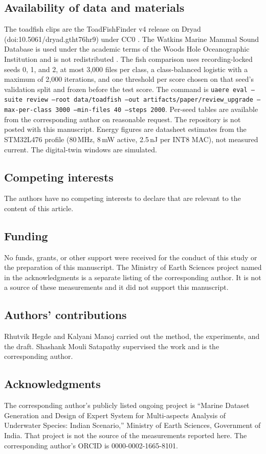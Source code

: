 \documentclass[sn-mathphys-num]{sn-jnl}%
\theoremstyle{thmstyleone}%
\theoremstyle{thmstyletwo}%
\theoremstyle{thmstylethree}%
\begin{document}
\subsection*{Availability of data and materials}
The toadfish clips are the ToadFishFinder v4 release on Dryad (doi:10.5061/dryad.gtht76hr9) under CC0 \cite{bohnenstiehl2023data}. The Watkins Marine Mammal Sound Database is used under the academic terms of the Woods Hole Oceanographic Institution and is not redistributed \cite{sayigh2016}. The fish comparison uses recording-locked seeds 0, 1, and 2, at most 3{,}000 files per class, a class-balanced logistic with a maximum of 2{,}000 iterations, and one threshold per score chosen on that seed's validation split and frozen before the test score. The command is \texttt{uaere eval --suite review --root data/toadfish --out artifacts/paper/review\_upgrade --max-per-class 3000 --min-files 40 --steps 2000}. Per-seed tables are available from the corresponding author on reasonable request. The repository is not posted with this manuscript. Energy figures are datasheet estimates from the STM32L476 profile (80\,MHz, 8\,mW active, 2.5\,nJ per INT8 MAC), not measured current. The digital-twin windows are simulated.

\subsection*{Competing interests}
The authors have no competing interests to declare that are relevant to the content of this article.

\subsection*{Funding}
No funds, grants, or other support were received for the conduct of this study or the preparation of this manuscript. The Ministry of Earth Sciences project named in the acknowledgments is a separate listing of the corresponding author. It is not a source of these measurements and it did not support this manuscript.

\subsection*{Authors' contributions}
Rhutvik Hegde and Kalyani Manoj carried out the method, the experiments, and the draft. Shashank Mouli Satapathy supervised the work and is the corresponding author.

\subsection*{Acknowledgments}
The corresponding author's publicly listed ongoing project is ``Marine Dataset Generation and Design of Expert System for Multi-aspects Analysis of Underwater Species: Indian Scenario,'' Ministry of Earth Sciences, Government of India. That project is not the source of the measurements reported here. The corresponding author's ORCID is 0000-0002-1665-8101.

%

\end{document}
